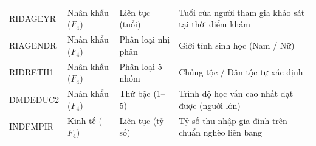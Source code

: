 \begin{longtable}{>{\raggedright\arraybackslash}p{2.9cm} >{\raggedright\arraybackslash}p{2.6cm} >{\raggedright\arraybackslash}p{2.5cm} >{\raggedright\arraybackslash}p{6.3cm}}
RIDAGEYR & Nhân khẩu ($F_4$) & Liên tục (tuổi) & Tuổi của người tham gia khảo sát tại thời điểm khám \\
RIAGENDR & Nhân khẩu ($F_4$) & Phân loại nhị phân & Giới tính sinh học (Nam / Nữ) \\
RIDRETH1 & Nhân khẩu ($F_4$) & Phân loại 5 nhóm & Chủng tộc / Dân tộc tự xác định \\
DMDEDUC2 & Nhân khẩu ($F_4$) & Thứ bậc (1--5) & Trình độ học vấn cao nhất đạt được (người lớn) \\
INDFMPIR & Kinh tế ($F_4$) & Liên tục (tỷ số) & Tỷ số thu nhập gia đình trên chuẩn nghèo liên bang \\
\end{longtable}
\endgroup

